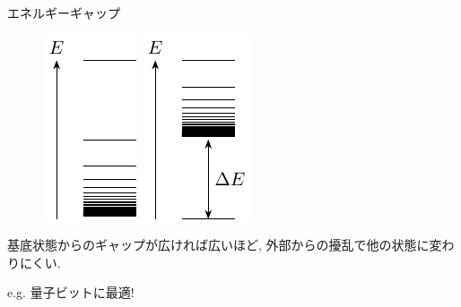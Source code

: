\documentclass[dvipdfm]{beamer}
\begin{document}
\begin{frame}{エネルギーギャップ}
    \begin{figure}
        \centering
        \begin{minipage}{0.45\linewidth}
            \includegraphics[width=0.3\linewidth]{gapless.pdf}
        \end{minipage}
        \begin{minipage}{0.45\linewidth}
            \includegraphics[width=0.3\linewidth]{gapped.pdf}
        \end{minipage}
    \end{figure}
    基底状態からのギャップが広ければ広いほど, 外部からの擾乱で他の状態に変わりにくい.

    e.g. 量子ビットに最適!
\end{frame}
\end{document}
